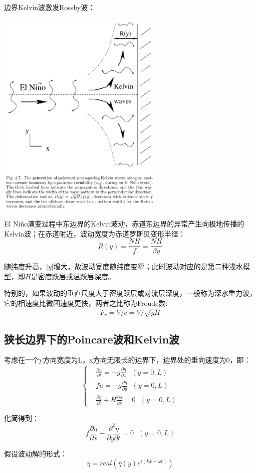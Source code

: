 \documentclass{article}
\begin{document}
边界Kelvin波激发Rossby波：
\begin{center}
    \includegraphics[width=8cm]{Fig3_3.png}
\end{center}
El Niño演变过程中东边界的Kelvin波动，赤道东边界的异常产生向极地传播的Kelvin波；在赤道附近，波动宽度为赤道罗斯贝变形半径：
$$R(y) = \frac{NH}{f} = \frac{NH}{\beta y}$$

随纬度升高，$|y|$增大，故波动宽度随纬度变窄；此时波动对应的是第二种浅水模型，即$H$是密度跃层或温跃层深度。

特别的，如果波动的垂直尺度大于密度跃层或对流层深度，一般称为深水重力波，它的相速度比微团速度更快，两者之比称为Froude数:
$$F_r = V/c = V/\sqrt{gH}$$

\subsection{狭长边界下的Poincare波和Kelvin波}
考虑在一个y方向宽度为L，x方向无限长的边界下，边界处的垂向速度为0，即：
$$\begin{cases}
    &\frac{\partial u}{\partial t}=-g\frac{\partial \eta}{\partial x} \ \ \ (y=0,L) \\
    &fu=-g\frac{\partial \eta}{\partial y} \ \ \ (y=0,L)\\
    &\frac{\partial \eta}{\partial t}+H\frac{\partial u}{\partial x} = 0 \ \ \ (y=0,L)
\end{cases}$$

化简得到：
$$f\frac{\partial \eta}{\partial x}-\frac{\partial^2 \eta}{\partial y\partial t} = 0 \ \ \ (y=0,L)$$

假设波动解的形式：
$$\eta = real(\overline{\eta}(y)e^{i(kx-\omega t)})$$
\end{document}
